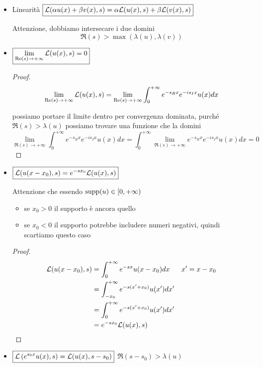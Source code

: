 \begin{itemize}
\item Linearità $\boxed{\mathcal{L}(\alpha u(x) + \beta v(x), s) = \alpha \mathcal{L}(u(x), s) + \beta \mathcal{L}(v(x), s)}$

Attenzione, dobbiamo intersecare i due domini
\begin{equation*}
\boxed{\Re (s) > \max(\lambda (u), \lambda (v))}
\end{equation*}
\item $\boxed{\lim\limits_{\operatorname{Re} (s)\rightarrow + \infty}\mathcal{L}(u(x), s) = 0}$

\begin{proof}
\begin{equation*}
\lim\limits_{\operatorname{Re} (s)\rightarrow + \infty}\mathcal{L}(u(x), s) = \lim\limits_{\operatorname{Re} (s)\rightarrow + \infty}\int^{+ \infty}_{0} e^{- s_{R} x} e^{- is_{I} x} u(x) dx
\end{equation*}

possiamo portare il limite dentro per convergenza dominata, purché $\Re (s) > \lambda (u)$ possiamo trovare una funzione che la domini
\begin{equation*}
\lim\limits_{\Re (s)\rightarrow + \infty}\int^{+ \infty}_{0} e^{- s_{R} x} e^{- is_{I} x} u(x) dx = \int^{+ \infty}_{0}\lim\limits_{\Re (s)\rightarrow + \infty} e^{- s_{R} x} e^{- is_{I} x} u(x) dx = 0
\end{equation*}
\end{proof}
\item $\boxed{\mathcal{L}(u(x - x_{0}), s) = e^{- sx_{0}}\mathcal{L}(u(x), s)}$

Attenzione che essendo $\operatorname*{supp}(u) \in [0, + \infty)$
\begin{itemize}
\item se $\boxed{x_{0} > 0}$ il supporto è ancora quello
\item se $x_{0} < 0$ il supporto potrebbe includere numeri negativi, quindi scartiamo questo caso
\end{itemize}

\begin{proof}
\begin{align*}
\mathcal{L}(u(x - x_{0}), s) & = \int^{+ \infty}_{0} e^{- sx} u(x - x_{0}) dx & x' = x - x_{0}\\
 & = \int^{+ \infty}_{- x_{0}} e^{- s(x' + x_{0})} u(x') dx' & \\
 & = \int^{+ \infty}_{0} e^{- s(x' + x_{0})} u(x') dx' & \\
 & = e^{- sx_{0}}\mathcal{L}(u(x), s) &
\end{align*}
\end{proof}
\item $\boxed{\mathcal{L}\left(e^{s_{0} x} u(x), s\right) = \mathcal{L}(u(x), s - s_{0})}$ $\boxed{\Re (s - s_{0}) > \lambda (u)}$


\end{itemize}
